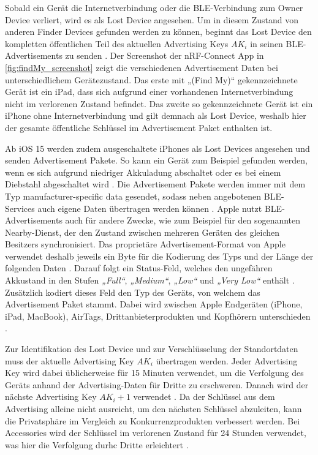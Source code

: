 Sobald ein Gerät die Internetverbindung oder die \ac{BLE}-Verbindung zum Owner Device verliert, wird es als Lost Device angesehen.
Um in diesem Zustand von anderen Finder Devices gefunden werden zu können, beginnt das Lost Device den kompletten öffentlichen Teil des aktuellen Advertising Keys $AK_i$ in seinen \ac{BLE}-Advertisements zu senden \cite{Apple_FindMySpec}.
Der Screenshot der nRF-Connect App in \autoref{fig:findMy_screenshot} zeigt die verschiedenen Advertisement Daten bei unterschiedlichem Gerätezustand.
Das erste mit „(Find My)“ gekennzeichnete Gerät ist ein iPad, dass sich aufgrund einer vorhandenen Internetverbindung nicht im verlorenen Zustand befindet.
Das zweite so gekennzeichnete Gerät ist ein iPhone ohne Internetverbindung und gilt demnach als Lost Device, weshalb hier der gesamte öffentliche Schlüssel im Advertisement Paket enthalten ist.

Ab iOS 15 werden zudem ausgeschaltete iPhones als Lost Devices angesehen und senden Advertisement Pakete.
So kann ein Gerät zum Beispiel gefunden werden, wenn es sich aufgrund niedriger Akkuladung abschaltet oder es bei einem Diebstahl abgeschaltet wird \cite{Classen_FindMy}.
Die Advertisement Pakete werden immer mit dem Typ manufacturer-specific data gesendet, sodass neben angebotenen \ac{BLE}-Services auch eigene Daten übertragen werden können \cite{Spec_BLE_5.3}.
Apple nutzt \ac{BLE}-Advertisements auch für andere Zwecke, wie zum Beispiel für den sogenannten Nearby-Dienst, der den Zustand zwischen mehreren Geräten des gleichen Besitzers synchronisiert.
Das proprietäre Advertisement-Format von Apple verwendet deshalb jeweils ein Byte für die Kodierung des Typs und der Länge der folgenden Daten \cite{Martin_continuity}.
Darauf folgt ein Status-Feld, welches den ungefähren Akkustand in den Stufen \textit{„Full“}, \textit{„Medium“}, \textit{„Low“} und \textit{„Very Low“} enthält \cite{Mayberry_Tracking}.
Zusätzlich kodiert dieses Feld den Typ des Geräts, von welchem das Advertisement Paket stammt.
Dabei wird zwischen Apple Endgeräten (iPhone, iPad, MacBook), AirTags, Drittanbieterprodukten und Kopfhörern unterschieden \cite{Heinrich_AirGuard,Mayberry_Tracking}.

Zur Identifikation des Lost Device und zur Verschlüsselung der Standortdaten muss der aktuelle Advertising Key $AK_i$ übertragen werden.
Jeder Advertising Key wird dabei üblicherweise für 15 Minuten verwendet, um die Verfolgung des Geräts anhand der Advertising-Daten für Dritte zu erschweren.
Danach wird der nächste Advertising Key $AK_i+1$ verwendet \cite{Heinrich_FindMy}.
Da der Schlüssel aus dem Advertising alleine nicht ausreicht, um den nächsten Schlüssel abzuleiten, kann die Privatsphäre im Vergleich zu Konkurrenzprodukten verbessert werden.
Bei Accessories wird der Schlüssel im verlorenen Zustand für 24 Stunden verwendet, was hier die Verfolgung durhc Dritte erleichtert \cite{Mayberry_Tracking,Roth_airtags}.

